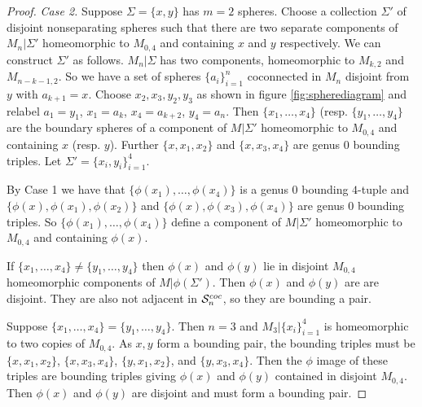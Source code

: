 \begin{proof}
\medskip \noindent \emph{Case 2.} Suppose $\Sigma=\{x,y\}$ has $m=2$ spheres.
Choose a collection $\Sigma'$ of disjoint nonseparating spheres such that  there are two separate components of $M_n|\Sigma'$ homeomorphic to $M_{0,4}$ and containing $x$ and $y$ respectively.
We can construct $\Sigma'$ as follows.
$M_n|\Sigma$ has two components, homeomorphic to $M_{k,2}$ and $M_{n-k-1,2}$.
So we have a set of spheres $\{a_i\}_{i=1}^n$ coconnected in $M_n$ disjoint from $y$ with $a_{k+1}=x$.
Choose $x_2,x_3,y_2,y_3$ as shown in figure \ref{fig:spherediagram} and relabel $a_1=y_1$, $x_{1}=a_k$, $x_4=a_{k+2}$, $y_4=a_n$.
Then
$\{x_1,\ldots, x_4\}$ (resp. $\{y_1, \ldots, y_4\}$ are the boundary spheres of a component of $M|\Sigma'$ homeomorphic to $M_{0,4}$ and containing $x$ (resp. $y$).
Further $\{x,x_1,x_2\}$ and $\{x,x_3,x_4\}$ are genus 0 bounding triples. Let $\Sigma' =\{x_i,y_i\}_{i=1}^4$.



By Case 1 we have that $\{\phi(x_1), \ldots, \phi(x_4)\}$ is a genus 0 bounding $4$-tuple and $\{\phi(x),\phi(x_1),\phi(x_2)\}$ and $\{\phi(x),\phi(x_3),\phi(x_4)\}$ are genus 0 bounding triples.
So $\{\phi(x_1), \ldots, \phi(x_4)\}$ define a component of $M|\Sigma'$ homeomorphic to $M_{0,4}$ and containing $\phi(x)$.

If $\{x_1, \ldots, x_4\} \neq \{y_1, \ldots, y_4\}$ then
 $\phi(x)$ and $\phi(y)$ lie in disjoint $M_{0,4}$ homeomorphic components of $M|\phi(\Sigma')$.
Then  $\phi(x)$ and $\phi(y)$ are are disjoint. They are also not adjacent in ${ \mathcal S^{{coc}}_{n} }$, so they are bounding a pair.

Suppose $\{x_1, \ldots, x_4\} = \{y_1, \ldots, y_4\}$.
Then $n=3$ and $M_3|\{x_i\}_{i=1}^4$ is homeomorphic to two copies of $M_{0,4}$.
As $x,y$ form a bounding pair, the bounding triples must be
$\{x,x_1,x_2\}$, $\{x,x_3,x_4\}$, $\{y,x_1,x_2\}$, and $\{y,x_3,x_4\}$.
Then the $\phi$ image of these triples are
bounding triples giving $\phi(x)$ and $\phi(y)$ contained in disjoint $M_{0,4}$.
Then $\phi(x)$ and $\phi(y)$ are disjoint and must form a bounding pair.
\end{proof}



